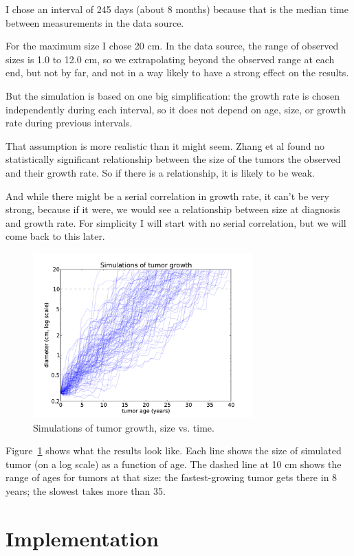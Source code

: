 \documentclass[12pt]{book}
\begin{document}
I chose an interval of 245 days (about 8 months) because that is the
median time between measurements in the data source.

For the maximum size I chose 20 cm.  In the data source, the range of
observed sizes is 1.0 to 12.0 cm, so we extrapolating beyond
the observed range at each end, but not by far, and not in a way
likely to have a strong effect on the results.

But the simulation is based on one big simplification:
the growth rate is chosen independently during each interval,
so it does not depend on age, size, or growth rate during
previous intervals.

That assumption is more realistic than it might seem.  Zhang et al
found no statistically significant relationship between the size
of the tumors the observed and their growth rate.  So if there is
a relationship, it is likely to be weak.

And while there might be a serial correlation in growth rate, it can't
be very strong, because if it were, we would see a relationship
between size at diagnosis and growth rate.  For simplicity I will
start with no serial correlation, but we will come back to this later.

\begin{figure}
\centerline{\includegraphics[height=2.5in]{figs/kidney4.pdf}}
\caption{Simulations of tumor growth, size vs. time.}
\label{fig.kidney4}
\end{figure}

Figure~\ref{fig.kidney4} shows what the results look like.  Each line
shows the size of simulated tumor (on a log scale) as a function of
age.  The dashed line at 10 cm shows the range of ages for tumors at
that size: the fastest-growing tumor gets there in 8 years; the
slowest takes more than 35.

\section{Implementation}
\end{document}
